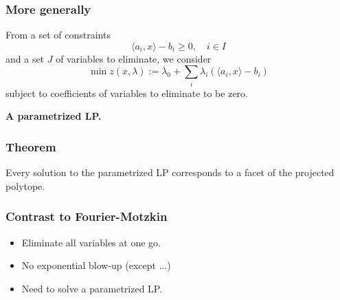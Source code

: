 \documentclass{beamer}
\begin{document}
\begin{frame}
  \frametitle{More generally}
  From a set of constraints
  \begin{displaymath}
    \langle a_i, x \rangle -b_i \ge 0 , \quad i\in I
  \end{displaymath}
  and a set $J$ of variables to eliminate, we consider
  \begin{displaymath}
    \min z(x,\lambda) := \lambda_0 + \sum_i \lambda_i (\langle a_i, x \rangle -b_i)
  \end{displaymath}
  subject to coefficients of variables to eliminate to be zero.
  \begin{center}
    \textbf{A parametrized LP.}
  \end{center}
\end{frame}

\begin{frame}
  \frametitle{Theorem}
  Every solution to the parametrized LP corresponds to a facet of the
  projected polytope.
\end{frame}

\begin{frame}
  \frametitle{Contrast to Fourier-Motzkin}
  \begin{itemize}
  \item<1-> Eliminate all variables at one go.
  \item<2-> No exponential blow-up (except ...)
  \item<3-> Need to solve a parametrized LP.
  \end{itemize}
\end{frame}
\end{document}
